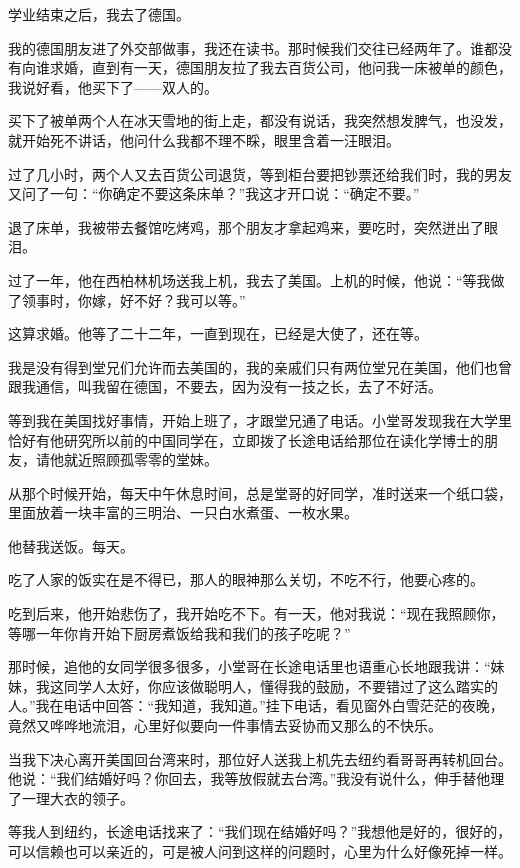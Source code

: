 \par 学业结束之后，我去了德国。
\par 我的德国朋友进了外交部做事，我还在读书。那时候我们交往已经两年了。谁都没有向谁求婚，直到有一天，德国朋友拉了我去百货公司，他问我一床被单的颜色，我说好看，他买下了——双人的。
\par 买下了被单两个人在冰天雪地的街上走，都没有说话，我突然想发脾气，也没发，就开始死不讲话，他问什么我都不理不睬，眼里含着一汪眼泪。
\par 过了几小时，两个人又去百货公司退货，等到柜台要把钞票还给我们时，我的男友又问了一句：“你确定不要这条床单？”我这才开口说：“确定不要。”
\par 退了床单，我被带去餐馆吃烤鸡，那个朋友才拿起鸡来，要吃时，突然迸出了眼泪。
\par 过了一年，他在西柏林机场送我上机，我去了美国。上机的时候，他说：“等我做了领事时，你嫁，好不好？我可以等。”
\par 这算求婚。他等了二十二年，一直到现在，已经是大使了，还在等。
\par 我是没有得到堂兄们允许而去美国的，我的亲戚们只有两位堂兄在美国，他们也曾跟我通信，叫我留在德国，不要去，因为没有一技之长，去了不好活。
\par 等到我在美国找好事情，开始上班了，才跟堂兄通了电话。小堂哥发现我在大学里恰好有他研究所以前的中国同学在，立即拨了长途电话给那位在读化学博士的朋友，请他就近照顾孤零零的堂妹。
\par 从那个时候开始，每天中午休息时间，总是堂哥的好同学，准时送来一个纸口袋，里面放着一块丰富的三明治、一只白水煮蛋、一枚水果。
\par 他替我送饭。每天。
\par 吃了人家的饭实在是不得已，那人的眼神那么关切，不吃不行，他要心疼的。
\par 吃到后来，他开始悲伤了，我开始吃不下。有一天，他对我说：“现在我照顾你，等哪一年你肯开始下厨房煮饭给我和我们的孩子吃呢？”
\par 那时候，追他的女同学很多很多，小堂哥在长途电话里也语重心长地跟我讲：“妹妹，我这同学人太好，你应该做聪明人，懂得我的鼓励，不要错过了这么踏实的人。”我在电话中回答：“我知道，我知道。”挂下电话，看见窗外白雪茫茫的夜晚，竟然又哗哗地流泪，心里好似要向一件事情去妥协而又那么的不快乐。
\par 当我下决心离开美国回台湾来时，那位好人送我上机先去纽约看哥哥再转机回台。他说：“我们结婚好吗？你回去，我等放假就去台湾。”我没有说什么，伸手替他理了一理大衣的领子。
\par 等我人到纽约，长途电话找来了：“我们现在结婚好吗？”我想他是好的，很好的，可以信赖也可以亲近的，可是被人问到这样的问题时，心里为什么好像死掉一样。
